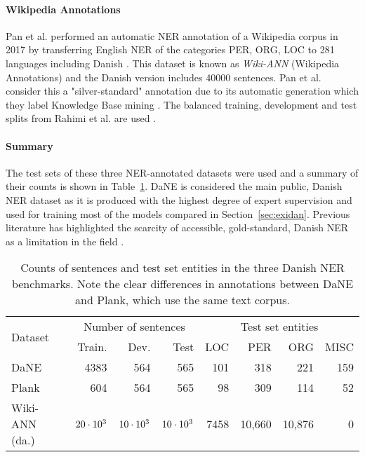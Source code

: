 \documentclass[main.tex]{subfiles}
\begin{document}
\paragraph{Wikipedia Annotations}
Pan et al. performed an automatic NER annotation of a Wikipedia corpus in 2017 by transferring English NER of the categories PER, ORG, LOC to 281 languages including Danish \cite{pan2017wikiann}.
This dataset is known as \emph{Wiki-ANN} (Wikipedia Annotations) and the Danish version includes 40000 sentences.
Pan et al. consider this a "silver-standard" annotation due to its automatic generation which they label Knowledge Base mining \cite[1946]{pan2017wikiann}.
The balanced training, development and test splits from Rahimi et al. are used \cite{rahimi2019transfer}.

\paragraph{Summary}
The test sets of these three NER-annotated datasets were used and a summary of their counts is shown in Table~\ref{tab:daNERdata}.
DaNE is considered the main public, Danish NER dataset as it is produced with the highest degree of expert supervision and used for training most of the models compared in Section~\ref{sec:exidan}.
Previous literature has highlighted the scarcity of accessible, gold-standard, Danish NER as a limitation in the field \cite[Sec. 2.1]{plank2019neural}.
\begin{table}[H]
    \centering
    \begin{tabular}{l|rrr|rrrr}
        \multirow{2}{*}{Dataset} & \multicolumn{3}{c|}{Number of sentences} & \multicolumn{4}{c}{Test set entities}\\
                                &Train. & Dev. & Test &LOC & PER & ORG & MISC \\\hline
        DaNE        & 4383 & 564 & 565 & 101 & 318 & 221 & 159 \\
        Plank       & 604  & 564 & 565 & 98  & 309 & 114 & 52 \\
        Wiki-ANN (da.)   & $20\cdot10^{3}$ & $10\cdot10^{3}$ & $10\cdot10^{3}$ & 7458 & 10,660 & 10,876 & 0
    \end{tabular}
    \caption{
        Counts of sentences and test set entities in the three Danish NER benchmarks.
        Note the clear differences in annotations between DaNE and Plank, which use the same text corpus.
    }
    \label{tab:daNERdata}
\end{table}
\end{document}
